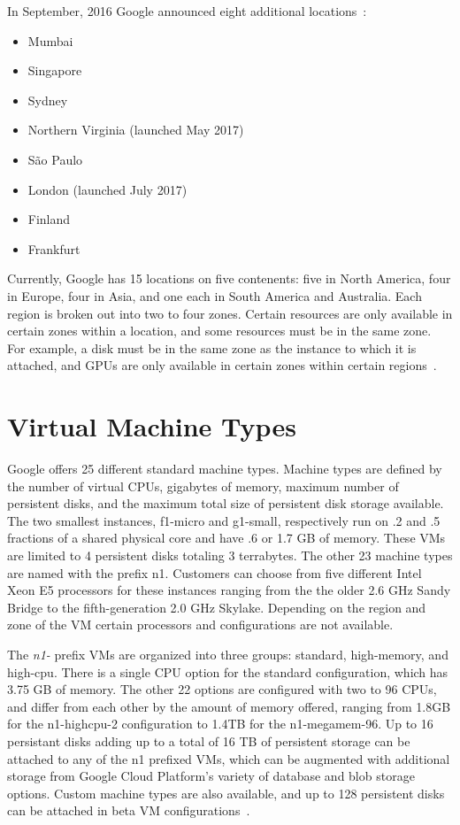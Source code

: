 In September, 2016 Google announced eight additional
locations~\cite{hid-sp18-419-gcp-history-medium}:
\begin{itemize}
  \item Mumbai
  \item Singapore
  \item Sydney
  \item Northern Virginia (launched May 2017)
  \item São Paulo
  \item London (launched July 2017)
  \item Finland
  \item Frankfurt
\end{itemize}

Currently, Google has 15 locations on five contenents: five in North
America, four in Europe, four in Asia, and one each in South America
and Australia. Each region is broken out into two to four
zones. Certain resources are only available in certain zones within a
location, and some resources must be in the same zone. For example, a
disk must be in the same zone as the instance to which it is attached,
and GPUs are only available in certain zones within certain
regions~\cite{hid-sp18-419-gce-regions-zones}.


\section{Virtual Machine Types}

Google offers 25 different standard machine types. Machine types are
defined by the number of virtual CPUs, gigabytes of memory, maximum
number of persistent disks, and the maximum total size of persistent
disk storage available. The two smallest instances, f1-micro and
g1-small, respectively run on .2 and .5 fractions of a shared physical
core and have .6 or 1.7 GB of memory. These VMs are limited to 4
persistent disks totaling 3 terrabytes. The other 23 machine types are
named with the prefix n1. Customers can choose from five different
Intel Xeon E5 processors for these instances ranging from the the
older 2.6 GHz Sandy Bridge to the fifth-generation 2.0 GHz
Skylake. Depending on the region and zone of the VM certain processors
and configurations are not available.

The \textit{n1-} prefix VMs are organized into three groups: standard,
high-memory, and high-cpu. There is a single CPU option for the
standard configuration, which has 3.75 GB of memory. The other 22
options are configured with two to 96 CPUs, and differ from each other
by the amount of memory offered, ranging from 1.8GB for the
n1-highcpu-2 configuration to 1.4TB for the n1-megamem-96. Up to 16
persistant disks adding up to a total of 16 TB of persistent storage
can be attached to any of the n1 prefixed VMs, which can be augmented
with additional storage from Google Cloud Platform's variety of
database and blob storage options. Custom machine types are also
available, and up to 128 persistent disks can be attached in beta VM
configurations~\cite{hid-sp18-419-gce-machine-types}.

